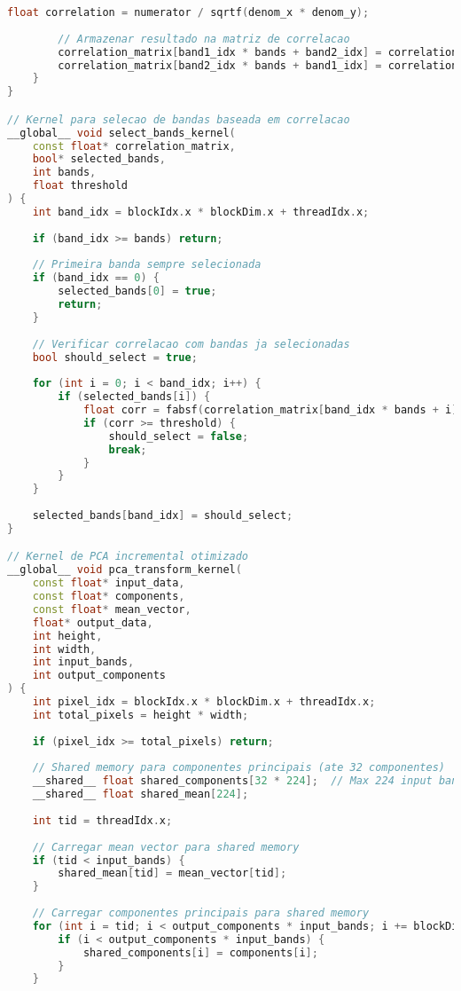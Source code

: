 \begin{lstlisting}[language=C++]
        float correlation = numerator / sqrtf(denom_x * denom_y);
        
        // Armazenar resultado na matriz de correlacao
        correlation_matrix[band1_idx * bands + band2_idx] = correlation;
        correlation_matrix[band2_idx * bands + band1_idx] = correlation;
    }
}

// Kernel para selecao de bandas baseada em correlacao
__global__ void select_bands_kernel(
    const float* correlation_matrix,
    bool* selected_bands,
    int bands,
    float threshold
) {
    int band_idx = blockIdx.x * blockDim.x + threadIdx.x;
    
    if (band_idx >= bands) return;
    
    // Primeira banda sempre selecionada
    if (band_idx == 0) {
        selected_bands[0] = true;
        return;
    }
    
    // Verificar correlacao com bandas ja selecionadas
    bool should_select = true;
    
    for (int i = 0; i < band_idx; i++) {
        if (selected_bands[i]) {
            float corr = fabsf(correlation_matrix[band_idx * bands + i]);
            if (corr >= threshold) {
                should_select = false;
                break;
            }
        }
    }
    
    selected_bands[band_idx] = should_select;
}

// Kernel de PCA incremental otimizado
__global__ void pca_transform_kernel(
    const float* input_data,
    const float* components,
    const float* mean_vector,
    float* output_data,
    int height,
    int width,
    int input_bands,
    int output_components
) {
    int pixel_idx = blockIdx.x * blockDim.x + threadIdx.x;
    int total_pixels = height * width;
    
    if (pixel_idx >= total_pixels) return;
    
    // Shared memory para componentes principais (ate 32 componentes)
    __shared__ float shared_components[32 * 224];  // Max 224 input bands
    __shared__ float shared_mean[224];
    
    int tid = threadIdx.x;
    
    // Carregar mean vector para shared memory
    if (tid < input_bands) {
        shared_mean[tid] = mean_vector[tid];
    }
    
    // Carregar componentes principais para shared memory
    for (int i = tid; i < output_components * input_bands; i += blockDim.x) {
        if (i < output_components * input_bands) {
            shared_components[i] = components[i];
        }
    }
    

\end{lstlisting}
